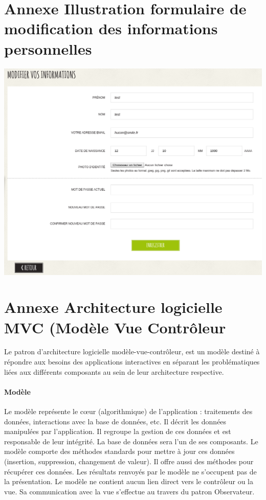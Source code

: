 \documentclass[a4paper,11pt,twoside]{report}
\begin{document}
  \section*{Annexe Illustration formulaire de modification des informations personnelles}
  \begin{center}
      \includegraphics[width=\textwidth]{images/SL_account_information_form.png} 
      \label{SL_account_information_form}
  \end{center}
  
  \newpage
  
  \section*{Annexe Architecture logicielle MVC (Modèle Vue Contrôleur}
  Le patron d'architecture logicielle modèle-vue-contrôleur, est un modèle destiné à répondre aux besoins des applications interactives en séparant les problématiques liées aux différents composants au sein de leur architecture respective.

  \paragraph*{Modèle}
  Le modèle représente le cœur (algorithmique) de l'application : traitements des données, interactions avec la base de données, etc. Il décrit les données manipulées par l'application. Il regroupe la gestion de ces données et est responsable de leur intégrité. La base de données sera l'un de ses composants. Le modèle comporte des méthodes standards pour mettre à jour ces données (insertion, suppression, changement de valeur). Il offre aussi des méthodes pour récupérer ces données. Les résultats renvoyés par le modèle ne s'occupent pas de la présentation. Le modèle ne contient aucun lien direct vers le contrôleur ou la vue. Sa communication avec la vue s'effectue au travers du patron Observateur.
\end{document}
